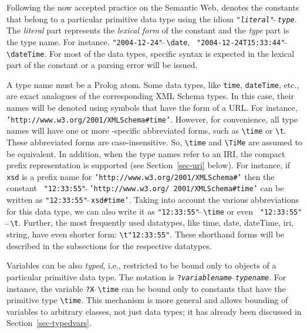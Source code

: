 \documentclass[11pt]{article}
\newcommand{\ERGO}{\mbox{\smaller{\ensuremath{\cal{E}}\smaller{{\sc{RGO}}}}}\xspace}
\newcommand{\FLSYSTEM}{\ERGO}
\newcommand{\bs}{\textbackslash}
\begin{document}
Following the now accepted practice on the Semantic Web, \FLSYSTEM denotes the
constants that belong to a particular primitive data type using the idiom
{\tt "\emph{literal}"$\widehat{~}\widehat{~}$\emph{type}}. The \emph{literal} part
represents the \emph{lexical form} 
of the constant and the \emph{type} part is the
type name. For instance, {\tt "2004-12-24"$\widehat{~}\widehat{~}$\bs{}date}, {\tt
  "2004-12-24T15:33:44"$\widehat{~}\widehat{~}$\bs{}dateTime}.
For most of the data types, specific syntax is expected in the lexical part
of the constant or a parsing error will be issued.

A type name must be a Prolog atom.
Some data types, like \texttt{time},  \texttt{dateTime},  etc., are exact analogues of the
corresponding XML Schema types. In this case, their names will be denoted
using symbols that have the form of a URL. For instance,
{\tt 'http://www.w3.org/2001/XMLSchema\#time'}.  However, for convenience,
all type names will have one or more \FLSYSTEM-specific abbreviated forms, such as
{\tt \bs{}time} or {\tt \bs{}t}. These abbreviated forms are
case-insensitive. So, {\tt \bs{}time} and
{\tt \bs{}TiMe} are assumed to be equivalent. In addition, when the type
names refer to an IRI, the compact prefix representation is supported (see
Section~\ref{sec-uri} below). For
instance, if {\tt xsd}  is a prefix name for
{\tt 'http://www.w3.org/2001/XMLSchema\#'} 
then the constant {\tt
  "12:33:55"$\widehat{~}\widehat{~}$'http://www.w3.org/ 2001/XMLSchema\#time'}  can be written as
{\tt "12:33:55"$\widehat{~}\widehat{~}$xsd\#time'}. Taking into account the
various abbreviations for this data type, we can also write it as
{\tt "12:33:55"$\widehat{~}\widehat{~}$\bs{}time} or even {\tt
  "12:33:55"$\widehat{~}\widehat{~}$\bs{}t}.
Further, the most frequently used datatypes, like time, date, dateTime, iri,
string,
have even shorter form:
\verb|\t"12:33:55"|.
These shorthand forms will be described in the subsections
for the respective datatypes.

Variables can be also \emph{typed}, i.e., restricted to be bound only to 
objects of a particular primitive data type.
The notation is {\tt ?\emph{variablename}$\hat{~}\hat{~}$\emph{typename}}. 
For instance, the variable {\tt ?X$\hat{~}\hat{~}$\bs{}time}  
can be bound only to constants that have the primitive type {\tt \bs{}time}. 
This mechanism is more general and allows bounding of variables to
arbitrary classes, not just data types; it has already been discussed in
Section~\ref{sec-typedvars}.
\end{document}
